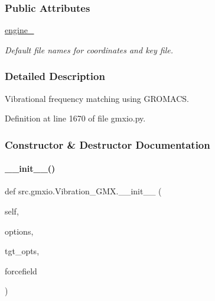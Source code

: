 \subsubsection*{Public Attributes}
\begin{DoxyCompactItemize}
\item 
\hyperlink{classsrc_1_1gmxio_1_1Vibration__GMX_ab657abb4629d7d53e6434855fa976f93}{engine\+\_\+}
\begin{DoxyCompactList}\small\item\em Default file names for coordinates and key file. \end{DoxyCompactList}\end{DoxyCompactItemize}


\subsubsection{Detailed Description}
Vibrational frequency matching using G\+R\+O\+M\+A\+CS. 



Definition at line 1670 of file gmxio.\+py.



\subsubsection{Constructor \& Destructor Documentation}
\mbox{\label{classsrc_1_1gmxio_1_1Vibration__GMX_af2ed8380679b143d304e4b17f048f9e0}} 
\paragraph{\texorpdfstring{\+\_\+\+\_\+init\+\_\+\+\_\+()}{\_\_init\_\_()}}
{\footnotesize\ttfamily def src.\+gmxio.\+Vibration\+\_\+\+G\+M\+X.\+\_\+\+\_\+init\+\_\+\+\_\+ (\begin{DoxyParamCaption}\item[{}]{self,  }\item[{}]{options,  }\item[{}]{tgt\+\_\+opts,  }\item[{}]{forcefield }\end{DoxyParamCaption})}



